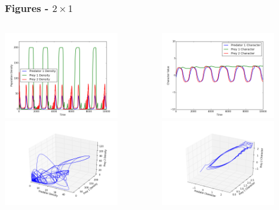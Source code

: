 \documentclass[10pt]{beamer}
\begin{document}
\begin{frame}
	\frametitle{Figures - $2\times1$}
	\begin{columns}[t]
		\begin{column}{.5\textwidth}
			\centering
			\includegraphics[width=5cm,height=3.75cm]{figures/1x2/variable_growth/densities_cyclic_domination.png}\\
			\includegraphics[width=5cm,height=3.75cm]{figures/1x2/variable_growth/density_phase_plane_cyclic_domination.png}
		\end{column}
		\begin{column}{.5\textwidth}
			\centering
			\includegraphics[width=5cm,height=3.75cm]{figures/1x2/variable_growth/traits_cyclic_domination.png}\\
			\includegraphics[width=5cm,height=3.75cm]{figures/1x2/variable_growth/trait_phase_plane_cyclic_domination.png}
		\end{column}
	\end{columns}
\end{frame}
\end{document}
